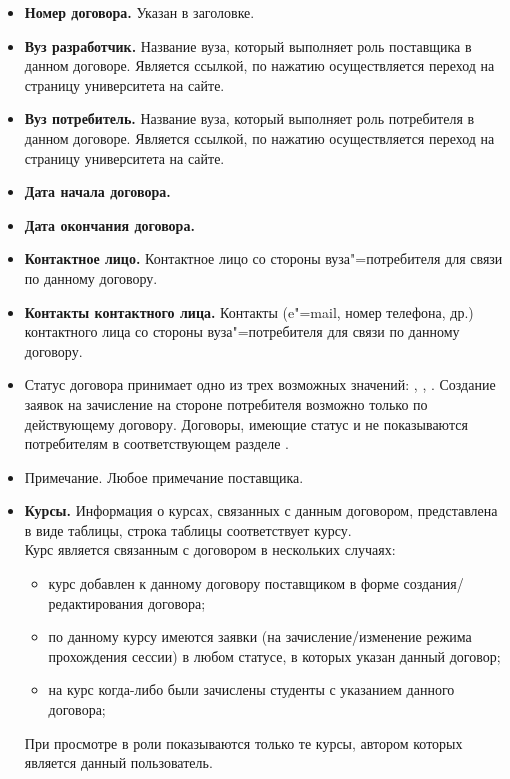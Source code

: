 \begin{itemize}
	\item \textbf{Номер договора.} Указан в заголовке.
	\item \textbf{Вуз разработчик.} Название вуза, который выполняет роль поставщика в данном договоре. Является ссылкой, по нажатию осуществляется переход на страницу университета на сайте.
	\item \textbf{Вуз потребитель.} Название вуза, который выполняет роль потребителя в данном договоре. Является ссылкой, по нажатию осуществляется переход на страницу университета на сайте.
	\item \textbf{Дата начала договора.}
	\item \textbf{Дата окончания договора.}
	\item \textbf{Контактное лицо.} Контактное лицо со стороны вуза"=потребителя для связи по данному договору.
	\item \textbf{Контакты контактного лица.} Контакты (e"=mail, номер телефона, др.) контактного лица со стороны вуза"=потребителя для связи по данному договору.
	\item Статус договора принимает одно из трех возможных значений: ,  ,  . Создание заявок на зачисление на стороне потребителя возможно только по действующему договору. Договоры, имеющие статус   и  не показываются потребителям в соответствующем разделе .
	\item Примечание. Любое примечание поставщика.
	\item \textbf{Курсы.} Информация о курсах, связанных с данным договором, представлена в виде таблицы, строка таблицы соответствует курсу. \\
	Курс является связанным с договором в нескольких случаях:
	\begin{itemize}
		\item курс добавлен к данному договору поставщиком в форме создания/редактирования договора;
		\item по данному курсу имеются заявки (на зачисление/изменение режима прохождения сессии) в любом статусе, в которых указан данный договор;
		\item на курс когда-либо были зачислены студенты с указанием данного договора;
	\end{itemize}
	При просмотре в роли  показываются только те курсы, автором которых является данный пользователь.\\

\end{itemize}
